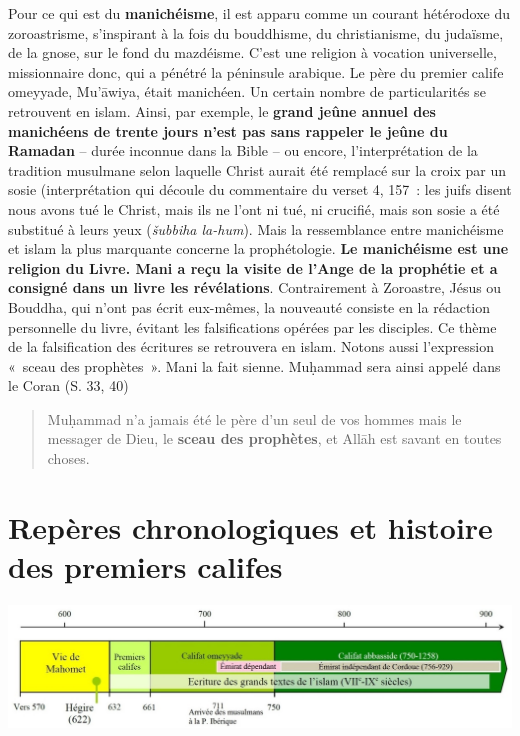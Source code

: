 Pour ce qui est du \textbf{manichéisme}, il est apparu comme un courant
hétérodoxe du zoroastrisme, s'inspirant à la fois du bouddhisme, du
christianisme, du judaïsme, de la gnose, sur le fond du mazdéisme. C'est
une religion à vocation universelle, missionnaire donc, qui a pénétré la
péninsule arabique. Le père du premier calife omeyyade, Mu'āwiya, était
manichéen. Un certain nombre de particularités se retrouvent en islam.
Ainsi, par exemple, le \textbf{grand jeûne annuel des manichéens de
trente jours n'est pas sans rappeler le jeûne du Ramadan} -- durée
inconnue dans la Bible -- ou encore, l'interprétation de la tradition
musulmane selon laquelle Christ aurait été remplacé sur la croix par un
sosie (interprétation qui découle du commentaire du verset 4, 157~: les
juifs disent nous avons tué le Christ, mais ils ne l'ont ni tué, ni
crucifié, mais son sosie a été substitué à leurs yeux (\emph{šubbiha
la-hum}). Mais la ressemblance entre manichéisme et islam la plus
marquante concerne la prophétologie. \textbf{Le manichéisme est une
religion du Livre. Mani a reçu la visite de l'Ange de la prophétie et a
consigné dans un livre les révélations}. Contrairement à Zoroastre,
Jésus ou Bouddha, qui n'ont pas écrit eux-mêmes, la nouveauté consiste
en la rédaction personnelle du livre, évitant les falsifications opérées
par les disciples. Ce thème de la falsification des écritures se
retrouvera en islam. Notons aussi l'expression «~sceau des prophètes~».
Mani la fait sienne. Muḥammad sera ainsi appelé dans le Coran (S. 33,
40)
\begin{quote}
Muḥammad n'a jamais été le père d'un seul de vos hommes mais le messager
de Dieu, le \textbf{sceau des prophètes}, et Allāh est savant en toutes
choses.

\textbf{}
\end{quote}


\section{Repères chronologiques et histoire des premiers
califes}

\includegraphics[width=\textwidth]{Images/image035.jpg}

